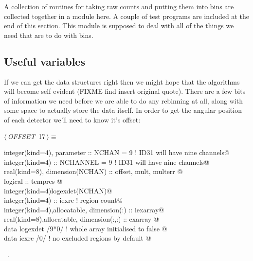 \documentclass[10pt,a4paper,notitlepage]{article}
\begin{document}
A collection of routines for taking raw counts and putting them into bins 
are collected together in a module here. A couple of test programs are
included at the end of this section.
This module is supposed to deal with all of the things we need that
are to do with bins.

\subsection{Useful variables}
If we can get the data structures right then we might hope that the 
algorithms will become self evident (FIXME find insert original quote). 
There are a few bits of information we need before we are able to do any 
rebinning at all, along with some space to actually store the data itself. 
In order to get the angular position of each detector we'll need to know 
it's offset:
\begin{flushleft} \small
\begin{minipage}{\linewidth}\label{scrap20}\raggedright\small
{} $\langle\,${\it OFFSET}\nobreak\ {\footnotesize {17}}$\,\rangle\equiv$
\vspace{-1ex}
\begin{list}{}{} \item
\mbox{}\verb@      integer(kind=4), parameter :: NCHAN = 9  ! ID31 will have nine channels@\\
\mbox{}\verb@      integer(kind=4) :: NCHANNEL = 9  ! ID31 will have nine channels@\\
\mbox{}\verb@      real(kind=8), dimension(NCHAN) :: offset, mult, multerr                @\\
\mbox{}\verb@      logical :: tempres @\\
\mbox{}\verb@      integer(kind=4)logexdet(NCHAN)@\\
\mbox{}\verb@      integer(kind=4) :: iexrc ! region count@\\
\mbox{}\verb@      integer(kind=4),allocatable, dimension(:) :: iexarray@\\
\mbox{}\verb@      real(kind=8),allocatable, dimension(:,:) :: exarray                               @\\
\mbox{}\verb@      data logexdet /9*0/ ! whole array initialised to false                @\\
\mbox{}\verb@      data iexrc /0/    ! no excluded regions by default                  @{\NWsep}
\end{list}
\vspace{-1.5ex}
\footnotesize
\begin{list}{}{\setlength{\itemsep}{-\parsep}\setlength{\itemindent}{-\leftmargin}}
\item \NWtxtMacroRefIn\ .

\item{}
\end{list}
\end{minipage}\vspace{4ex}
\end{flushleft}
\end{document}
